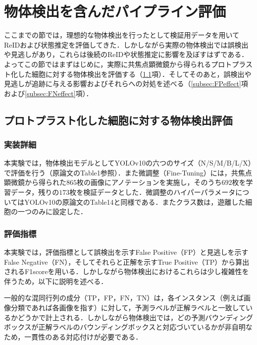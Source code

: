 \section{物体検出を含んだパイプライン評価}
\label{sec:pipleline_evaluation_with_detection}

ここまでの節では，理想的な物体検出を行ったとして検証用データを用いてReIDおよび状態推定を評価してきた．しかしながら実際の物体検出では誤検出や見逃しがあり，これらは後続のReIDや状態推定に影響を及ぼすはずである．よってこの節ではまずはじめに，実際に共焦点顕微鏡から得られるプロトプラスト化した細胞に対する物体検出を評価する（\ref{subsec:detection_of_protoplast}項）．そしてそのあと，誤検出や見逃しが追跡に与える影響およびそれらへの対処を述べる（\ref{subsec:FPeffect}項および\ref{subsec:FNeffect}項）．

    \subsection{プロトプラスト化した細胞に対する物体検出評価}
    \label{subsec:detection_of_protoplast}

    \subsubsection{実装詳細}

    本実験では，物体検出モデルとしてYOLOv10の六つのサイズ（N/S/M/B/L/X）で評価を行う（原論文\cite{wang2024yolov10}のTable1参照）．また微調整（Fine-Tuning）には，共焦点顕微鏡から得られた$865$枚の画像にアノテーションを実施し，そのうち$692$枚を学習データ，残りの$173$枚を検証データとした．微調整のハイパーパラメータについてはYOLOv10の原論文\cite{wang2024yolov10}のTable14と同様である．またクラス数は，遊離した細胞の一つのみに設定した．

    \subsubsection{評価指標}

    本実験では，評価指標として誤検出を示すFalse Positive（FP）と見逃しを示すFalse Negative（FN），そしてそれらと正解を示すTrue Positive（TP）から算出されるF1scoreを用いる．しかしながら物体検出におけるこれらは少し複雑性を伴うため，以下に説明を述べる．

    一般的な混同行列の成分（TP，FP，FN，TN）は，各インスタンス（例えば画像分類であれば各画像を指す）に対して，予測ラベルが正解ラベルと一致しているかどうかで計上される．しかしながら物体検出では，どの予測バウンディングボックスが正解ラベルのバウンディングボックスと対応づいているかが非自明なため，一貫性のある対応付けが必要である．

